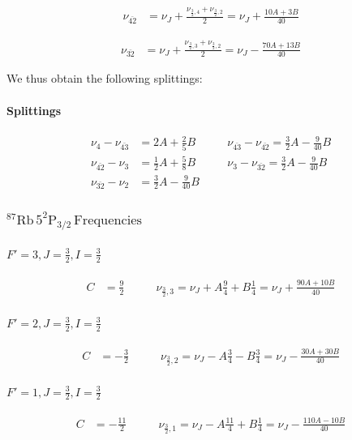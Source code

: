 \documentclass[12pt]{article}
\begin{document}
\begin{align*}
\nu_{\bar{42}} &= \nu_J + \frac{\nu_{\frac{3}{2},4} + \nu_{\frac{3}{2},2}}{2} = \nu_J + \frac{10A+3B}{40}
\end{align*}

\begin{align*}
\nu_{\bar{32}} &= \nu_J + \frac{\nu_{\frac{3}{2},3} + \nu_{\frac{3}{2},2}}{2} = \nu_J - \frac{70A+13B}{40}
\end{align*}

We thus obtain the following splittings:
\paragraph{Splittings}
\begin{align}
	\nu_{4}-\nu_{\bar{43}} &= 2A+\frac{2}{5}B\qquad & \nu_{\bar{43}}-\nu_{\bar{42}}= \frac{3}{2}A-\frac{9}{40}B\nonumber\\
	\nu_{\bar{42}}-\nu_{3} &= \frac{1}{2}A+\frac{5}{8}B\qquad & \nu_{3}-\nu_{\bar{32}}= \frac{3}{2}A-\frac{9}{40}B\label{eq:85splittings}\\
	\nu_{\bar{32}}-\nu_2 &= \frac{3}{2}A-\frac{9}{40}B\nonumber
\end{align}


\subsubsection*{${}^{87}\text{Rb}\,5^2\text{P}_{3/2}\,\text{Frequencies}$}

\paragraph{$F' = 3, J = \frac{3}{2}, I = \frac{3}{2}$}
\begin{align*}
C &= \frac{9}{2}\qquad
&\nu_{\frac{3}{2},3} = \nu_J + A \frac{9}{4} + B\frac{1}{4}= \nu_J +  \frac{90A+10B}{40}
\end{align*}

\paragraph{$F' = 2, J = \frac{3}{2}, I = \frac{3}{2}$}
\begin{align*}
C &= -\frac{3}{2}\qquad
&\nu_{\frac{3}{2},2} = \nu_J - A \frac{3}{4} - B\frac{3}{4}= \nu_J - \frac{30A+30B}{40}
\end{align*}

\paragraph{$F' = 1, J = \frac{3}{2}, I = \frac{3}{2}$}
\begin{align*}
C &= -\frac{11}{2}\qquad
&\nu_{\frac{3}{2},1} = \nu_J - A \frac{11}{4} + B\frac{1}{4} = \nu_J - \frac{110A-10B}{40}
\end{align*}
\end{document}
